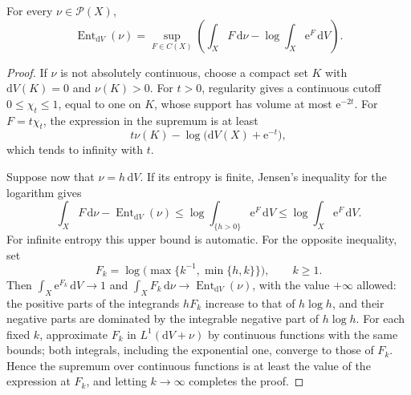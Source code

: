 \begin{lemma}\label{lem:entropy-variational}
For every $\nu\in\mathcal P(X)$,
\[
 \operatorname{Ent}_{\mathrm{d}V}(\nu)
 =\sup_{F\in C(X)}\left(\int_XF\,\mathrm{d}\nu
                     -\log\int_X\mathrm{e}^F\,\mathrm{d}V\right).
\]
\end{lemma}
\begin{proof}
If $\nu$ is not absolutely continuous, choose a compact set $K$ with $\mathrm{d}V(K)=0$ and $\nu(K)>0$. For $t>0$, regularity gives a continuous cutoff $0\leq\chi_t\leq1$, equal to one on $K$, whose support has volume at most $\mathrm{e}^{-2t}$. For $F=t\chi_t$, the expression in the supremum is at least
\[
 t\nu(K)-\log\bigl(\mathrm{d}V(X)+\mathrm{e}^{-t}\bigr),
\]
which tends to infinity with $t$.

Suppose now that $\nu=h\,\mathrm{d}V$. If its entropy is finite, Jensen's inequality for the logarithm gives
\[
 \int_XF\,\mathrm{d}\nu-\operatorname{Ent}_{\mathrm{d}V}(\nu)
 \leq\log\int_{\{h>0\}}\mathrm{e}^F\,\mathrm{d}V
 \leq\log\int_X\mathrm{e}^F\,\mathrm{d}V.
\]
For infinite entropy this upper bound is automatic. For the opposite inequality, set
\[
 F_k=\log\bigl(\max\{k^{-1},\min\{h,k\}\}\bigr),\qquad k\geq1.
\]
Then $\int_X\mathrm{e}^{F_k}\,\mathrm{d}V\to1$ and $\int_XF_k\,\mathrm{d}\nu\to\operatorname{Ent}_{\mathrm{d}V}(\nu)$, with the value $+\infty$ allowed: the positive parts of the integrands $hF_k$ increase to that of $h\log h$, and their negative parts are dominated by the integrable negative part of $h\log h$. For each fixed $k$, approximate $F_k$ in $L^1(\mathrm{d}V+\nu)$ by continuous functions with the same bounds; both integrals, including the exponential one, converge to those of $F_k$. Hence the supremum over continuous functions is at least the value of the expression at $F_k$, and letting $k\to\infty$ completes the proof.
\end{proof}
